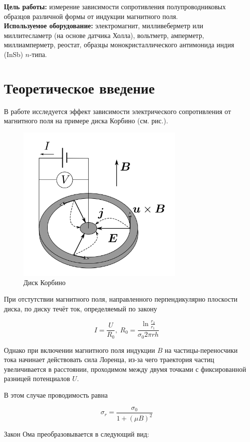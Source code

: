 \textbf{Цель работы:} измерение зависимости сопротивления полупроводниковых образцов различной формы от индукции магнитного поля. \\

\textbf{Используемое оборудование:} электромагнит, милливеберметр или миллитесламетр (на основе датчика Холла), вольтметр, амперметр, миллиамперметр, реостат, образцы монокристаллического антимонида индия (InSb) $n$-типа.
                    
\section{Теоретическое введение}

В работе исследуется эффект зависимости электрического сопротивления от магнитного поля на примере диска Корбино (см. рис.).

\begin{figure}[h]
    \centering
    \includegraphics[width = 5 cm]{images/1.png}
    \caption{Диск Корбино}
    \label{karb}
\end{figure}

При отстутствии магнитного поля, направленного перпендикулярно плоскости диска, по диску течёт ток, определяемый по закону 

\begin{equation}
    I = \frac{U}{R_0}, \; R_0 = \frac{\ln{\frac{r_2}{r_1}}}{\sigma_0 2 \pi r h}
\end{equation}

Однако при включении магнитного поля индукции $B$ на частицы-переносчики тока начинает действовать сила Лоренца, из-за чего траектория частиц увеличивается в расстоянии, проходимом между двумя точками с фиксированной разницей потенциалов $U$.

В этом случае проводимость  равна 

\begin{equation}
    \sigma_r = \frac{\sigma_0}{1 + (\mu B)^2}
\end{equation}

Закон Ома преобразовывается в следующий вид:


